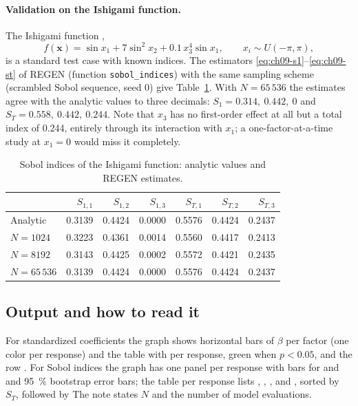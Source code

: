 \paragraph{Validation on the Ishigami function.} The Ishigami function \citep{ishigami1990},
\begin{equation}
f(\mathbf x)=\sin x_1+7\sin^2x_2+0.1\,x_3^4\sin x_1,\qquad x_i\sim U(-\pi,\pi),
\label{eq:ch09-ishigami}
\end{equation}
is a standard test case with known indices. The estimators \eqref{eq:ch09-s1}--\eqref{eq:ch09-st} of REGEN
(function \texttt{sobol\_indices}) with the same sampling scheme (scrambled Sobol sequence, seed 0) give
Table~\ref{tab:ch09-ishigami}. With $N=65\,536$ the estimates agree with the analytic values to three decimals:
$S_1=0.314,\ 0.442,\ 0$ and $S_T=0.558,\ 0.442,\ 0.244$. Note that $x_3$ has no first-order effect at all but a
total index of 0.244, entirely through its interaction with $x_1$; a one-factor-at-a-time study at $x_1=0$ would
miss it completely.

\begin{table}[htbp]
\centering
\small
\caption{Sobol indices of the Ishigami function: analytic values and REGEN estimates.}
\label{tab:ch09-ishigami}
\begin{tabular}{@{}lrrrrrr@{}}
\toprule
 & $S_{1,1}$ & $S_{1,2}$ & $S_{1,3}$ & $S_{T,1}$ & $S_{T,2}$ & $S_{T,3}$ \\
\midrule
Analytic & 0.3139 & 0.4424 & 0.0000 & 0.5576 & 0.4424 & 0.2437 \\
$N=1024$ & 0.3223 & 0.4361 & 0.0014 & 0.5560 & 0.4417 & 0.2413 \\
$N=8192$ & 0.3143 & 0.4425 & 0.0002 & 0.5572 & 0.4421 & 0.2435 \\
$N=65\,536$ & 0.3139 & 0.4424 & 0.0000 & 0.5576 & 0.4424 & 0.2437 \\
\bottomrule
\end{tabular}
\end{table}

\subsection{Output and how to read it}
For standardized coefficients the graph shows horizontal bars of $\beta$ per factor (one color per response) and the
table  with  per response, green when $p<0.05$, and the row
. For Sobol indices the graph has one panel per response with bars for  and  and 95~\% bootstrap error bars; the table per response lists , ,
,  and , sorted by $S_T$, followed by  The note states $N$ and the number of model evaluations.

